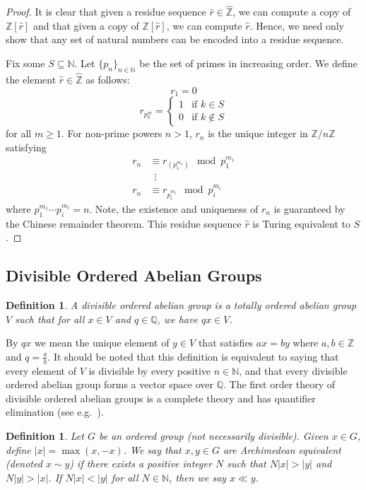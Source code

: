 \documentclass{amsart}%
\numberwithin{theorem}{section}
\newtheorem{definition}[theorem]{Definition}
\newcommand{\Q}{\mathbb{Q}}
\newcommand{\Z}{\mathbb{Z}}
\newcommand{\N}{\mathbb{N}}
\newcommand{\0}{\emptyset}
\begin{document}
\begin{proof}
It is clear that given a residue sequence $\hat r\in \widehat{\Z}$, we can compute a copy of $\Z[\hat r]$ and that given a copy of 
$\Z[\hat r]$, we can compute $\hat r$. Hence, we need only show that any set of natural numbers can be encoded into a residue sequence. 

Fix some $S\subseteq \N$. Let $\{p_n\}_{n\in \N}$ be the set of primes in increasing order. We define the element $\hat r\in \widehat{\Z}$ as follows: $$r_1=0 $$ $$r_{p_k^m}= \begin{cases} 
1 & \text{if } k\in S\\
0 & \text{if } k\notin S

\end{cases}$$ 
for all $m\geq1$. For non-prime powers $n>1$, $r_n$ is the unique integer in $\Z/n\Z$ satisfying
\begin{align*}
  r_n &\equiv r_{(p_1^{m_1})} \mod {p_1^{m_1}}\\
  &\,\,\,\vdots \\
  r_n &\equiv r_{p_i^{m_i}} \mod {p_i^{m_i}}
\end{align*}
where $p_1^{m_1}\cdots p_i^{m_i}=n $. Note, the existence and uniqueness of $r_n$ is guaranteed by the Chinese remainder theorem. This residue sequence $\hat r$ is Turing equivalent to $S$.
\end{proof}


\subsection{Divisible Ordered Abelian Groups}
\begin{definition}
    A divisible ordered abelian group is a totally ordered abelian group $V$ such that for all $x\in V$ and $q\in \Q$, we have $qx\in V$. 
\end{definition}
\noindent By $qx$ we mean the unique element of $y\in V$ that satisfies $ax=by$ where $a,b\in \Z$ and $q=\frac{a}{b}$. It should be noted that this definition is equivalent to saying that every element of $V$ is divisible by every positive $n\in \N$, and that every divisible ordered abelian group forms a vector space over $\Q$. The first order theory of divisible ordered abelian groups is a complete theory and has quantifier elimination (see e.g.\ \cite{marker2002}).

\begin{definition}
\label{arch equiv}
Let $G$ be an ordered group (not necessarily divisible). Given $x\in G$, define $|x|=\max(x,-x)$. We say that $x,y\in G$ are Archimedean equivalent (denoted $x\sim y$) if there exists a positive integer $N$ such that $N|x|>|y|$ and $N|y|>|x|$. If $N|x|<|y|$ for all $N\in \N$, then we say $x\ll y$. 
\end{definition}
\end{document}
